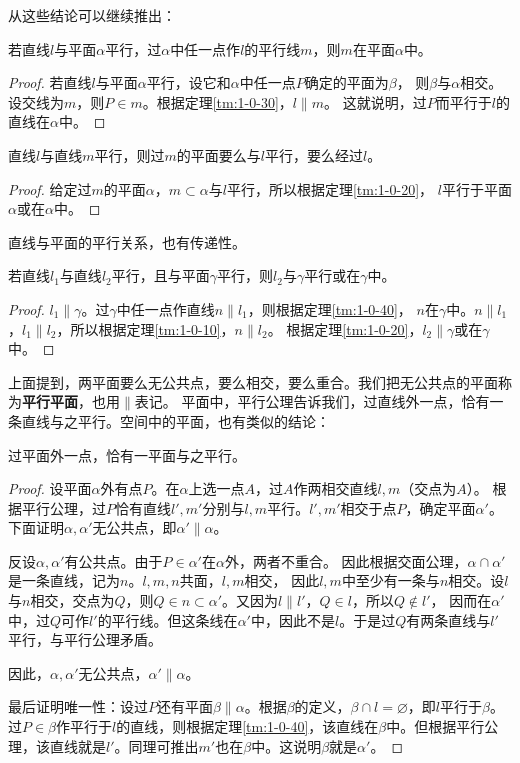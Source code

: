 \documentclass[12pt,UTF8]{ctexbook}
\begin{document}
从这些结论可以继续推出：
\begin{tm}\label{tm:1-0-40}
    若直线$l$与平面$\alpha$平行，过$\alpha$中任一点作$l$的平行线$m$，则$m$在平面$\alpha$中。
\end{tm}
\begin{proof}
    若直线$l$与平面$\alpha$平行，设它和$\alpha$中任一点$P$确定的平面为$\beta$，
    则$\beta$与$\alpha$相交。设交线为$m$，则$P\in m$。根据定理\ref{tm:1-0-30}，$l\parallel m$。
    这就说明，过$P$而平行于$l$的直线在$\alpha$中。
\end{proof}
\begin{tm}\label{tm:1-0-41}
    直线$l$与直线$m$平行，则过$m$的平面要么与$l$平行，要么经过$l$。
\end{tm}
\begin{proof}
    给定过$m$的平面$\alpha$，$m\subset \alpha$与$l$平行，所以根据定理\ref{tm:1-0-20}，
    $l$平行于平面$\alpha$或在$\alpha$中。
\end{proof}

直线与平面的平行关系，也有传递性。
\begin{tm}
    若直线$l_1$与直线$l_2$平行，且与平面$\gamma$平行，则$l_2$与$\gamma$平行或在$\gamma$中。
\end{tm}
\begin{proof}
    $l_1\parallel \gamma$。过$\gamma$中任一点作直线$n\parallel l_1$，则根据定理\ref{tm:1-0-40}，
    $n$在$\gamma$中。$n\parallel l_1$，$l_1\parallel l_2$，所以根据定理\ref{tm:1-0-10}，$n\parallel l_2$。
    根据定理\ref{tm:1-0-20}，$l_2\parallel \gamma$或在$\gamma$中。
\end{proof}

上面提到，两平面要么无公共点，要么相交，要么重合。我们把无公共点的平面称为\textbf{平行平面}，也用$\parallel$表记。
平面中，平行公理告诉我们，过直线外一点，恰有一条直线与之平行。空间中的平面，也有类似的结论：
\begin{tm}\label{tm:1-0-50}
    过平面外一点，恰有一平面与之平行。
\end{tm}
\begin{proof}
    设平面$\alpha$外有点$P$。在$\alpha$上选一点$A$，过$A$作两相交直线$l,m$（交点为$A$）。
    根据平行公理，过$P$恰有直线$l', m'$分别与$l,m$平行。$l',m'$相交于点$P$，确定平面$\alpha'$。
    下面证明$\alpha,\alpha'$无公共点，即$\alpha'\parallel\alpha$。

    反设$\alpha,\alpha'$有公共点。由于$P\in\alpha'$在$\alpha$外，两者不重合。
    因此根据交面公理，$\alpha \cap \alpha'$是一条直线，记为$n$。$l,m,n$共面，$l,m$相交，
    因此$l,m$中至少有一条与$n$相交。设$l$与$n$相交，交点为$Q$，则$Q\in n\subset\alpha'$。又因为$l\parallel l'$，$Q\in l$，所以$Q\notin l'$，
    因而在$\alpha'$中，过$Q$可作$l'$的平行线。但这条线在$\alpha'$中，因此不是$l$。于是过$Q$有两条直线与$l'$平行，与平行公理矛盾。
        
    因此，$\alpha,\alpha'$无公共点，$\alpha'\parallel\alpha$。

    最后证明唯一性：设过$P$还有平面$\beta \parallel \alpha$。根据$\beta$的定义，$\beta\cap l=\varnothing$，即$l$平行于$\beta$。过$P\in\beta$作平行于$l$的直线，则根据定理\ref{tm:1-0-40}，该直线在$\beta$中。但根据平行公理，该直线就是$l'$。同理可推出$m'$也在$\beta$中。这说明$\beta$就是$\alpha'$。
\end{proof}
\end{document}
